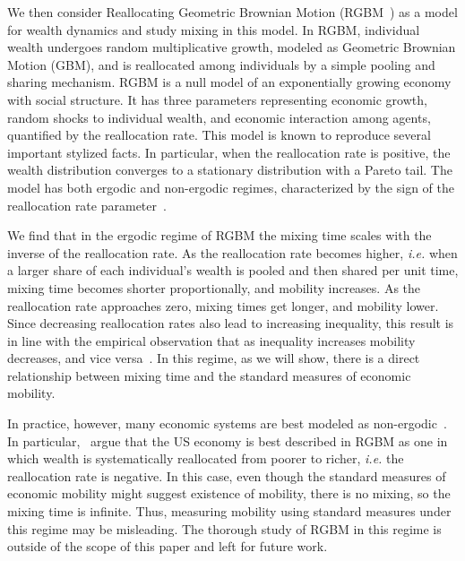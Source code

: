\documentclass[11pt]{article}
\newcommand{\blue}[1]{{\color{blue} #1}}
\newcommand{\ie}{{\it i.e.}\xspace}
\newcommand{\YB}[1]{\blue{{\it YB: #1 YB}}}
\numberwithin{equation}{section}
\begin{document}
We then consider Reallocating Geometric Brownian Motion (RGBM~\citep{MarsiliMaslovZhang1998,LiuSerota2017,BermanPetersAdamou2019}) as a model for wealth dynamics and study mixing in this model. In RGBM, individual wealth undergoes random multiplicative growth, modeled as Geometric Brownian Motion (GBM), and is reallocated among individuals by a simple pooling and sharing mechanism. RGBM is a null model of an exponentially growing economy with social structure. It has three parameters representing economic growth, random shocks to individual wealth, and economic interaction among agents, quantified by the reallocation rate. This model is known to reproduce several important stylized facts. In particular, when the reallocation rate is positive, the wealth distribution converges to a stationary distribution with a Pareto tail. The model has both ergodic and non-ergodic regimes, characterized by the sign of the reallocation rate parameter~\citep{BermanPetersAdamou2019}.

We find that in the ergodic regime of RGBM the mixing time scales with the inverse of the reallocation rate. As the reallocation rate becomes higher, \ie when a larger share of each individual's wealth is pooled and then shared per unit time, mixing time becomes shorter proportionally, and mobility increases. As the reallocation rate approaches zero, mixing times get longer, and mobility lower. Since decreasing reallocation rates also lead to increasing inequality, this result is in line with the empirical observation that as inequality increases mobility decreases, and vice versa~\citep{corak2013}.
%
%
In this regime, as we will show, there is a direct relationship between mixing time and the standard measures of economic mobility. 

In practice, however, many economic systems are best modeled as non-ergodic~\citep{Peters2019b}. In particular,~\citet{BermanPetersAdamou2019} argue that the US economy is best described in RGBM as one in which wealth is systematically reallocated from poorer to richer, \ie the reallocation rate is negative. In this case, even though the standard measures of economic mobility might suggest existence of mobility, there is no mixing, so the mixing time is infinite. Thus, measuring mobility using standard measures under this regime may be misleading. The thorough study of RGBM in this regime is outside of the scope of this paper and left for future work.
\end{document}
